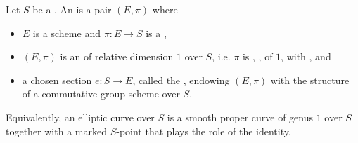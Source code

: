 \begin{definition} \label{definition:elliptic_curve_over_a_scheme}
Let $S$ be a . 
An  is a pair $(E, \pi)$ where
\begin{itemize}
    \item $E$ is a scheme and $\pi: E \to S$ is a ,
    \item $(E, \pi)$ is an  of relative dimension $1$ over $S$, i.e. $\pi$ is , , of  $1$, with , and 
    \item a chosen section $e: S \to E$, called the , endowing $(E, \pi)$ with the structure of a commutative group scheme over $S$.
\end{itemize}
Equivalently, an elliptic curve over $S$ is a smooth proper curve of genus $1$ over $S$ together with a marked $S$-point that plays the role of the identity.
\end{definition}
